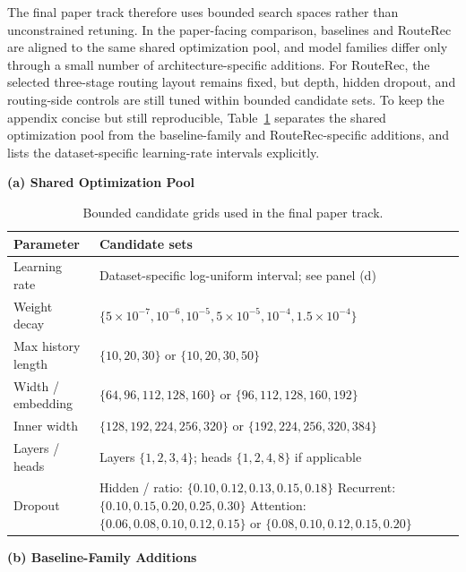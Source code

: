 \documentclass[sigconf,review,anonymous]{acmart}
\begin{document}
The final paper track therefore uses bounded search spaces rather than unconstrained retuning. In the paper-facing comparison, baselines and RouteRec are aligned to the same shared optimization pool, and model families differ only through a small number of architecture-specific additions. For RouteRec, the selected three-stage routing layout remains fixed, but depth, hidden dropout, and routing-side controls are still tuned within bounded candidate sets. To keep the appendix concise but still reproducible, Table~\ref{tab:appendix-final-grid} separates the shared optimization pool from the baseline-family and RouteRec-specific additions, and lists the dataset-specific learning-rate intervals explicitly.

\begin{table}[!t]
  \centering
  \caption{Bounded candidate grids used in the final paper track.}
  \label{tab:appendix-final-grid}
  \footnotesize

  \begin{minipage}[t]{0.54\textwidth}
    \textbf{(a) Shared Optimization Pool}

    \vspace{0.25em}
    \scriptsize
    \setlength{\tabcolsep}{4pt}
    \renewcommand{\arraystretch}{1.03}
    \begin{tabularx}{\linewidth}{@{}lX@{}}
      \toprule
      Parameter & Candidate sets \\
      \midrule
      Learning rate & Dataset-specific log-uniform interval; see panel (d) \\
      Weight decay & $\{5\times10^{-7},10^{-6},10^{-5},5\times10^{-5},10^{-4},1.5\times10^{-4}\}$ \\
      Max history length & $\{10,20,30\}$ or $\{10,20,30,50\}$ \\
      Width / embedding & $\{64,96,112,128,160\}$ or $\{96,112,128,160,192\}$ \\
      Inner width & $\{128,192,224,256,320\}$ or $\{192,224,256,320,384\}$ \\
      Layers / heads & Layers $\{1,2,3,4\}$; heads $\{1,2,4,8\}$ if applicable \\
      Dropout & Hidden / ratio: $\{0.10,0.12,0.13,0.15,0.18\}$\newline
      Recurrent: $\{0.10,0.15,0.20,0.25,0.30\}$\newline
      Attention: $\{0.06,0.08,0.10,0.12,0.15\}$ or $\{0.08,0.10,0.12,0.15,0.20\}$ \\
      \bottomrule
    \end{tabularx}
  \end{minipage}\hfill
  \begin{minipage}[t]{0.42\textwidth}
    \textbf{(b) Baseline-Family Additions}


\end{minipage}
\end{table}
\end{document}
